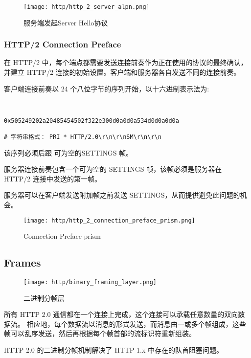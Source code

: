 \begin{figure}[H]
    \centering
    \texttt{[image: http/http\_2\_server\_alpn.png]}
    \caption{服务端发起Server Hello协议}
\end{figure}


\subsubsection{HTTP/2 Connection Preface}


在 HTTP/2 中，每个端点都需要发送连接前奏作为正在使用的协议的最终确认，并建立 HTTP/2 连接的初始设置。客户端和服务器各自发送不同的连接前奏。

客户端连接前奏以 24 个八位字节的序列开始，以十六进制表示法为:

\begin{lstlisting}[style=cshell]


0x505249202a20485454502f322e300d0a0d0a534d0d0a0d0a

# 字符串格式： PRI * HTTP/2.0\r\n\r\nSM\r\n\r\n

\end{lstlisting}

该序列必须后跟 可为空的SETTINGS 帧。


服务器连接前奏包含一个可为空的 SETTINGS 帧，该帧必须是服务器在 HTTP/2 连接中发送的第一帧。

服务器可以在客户端发送附加帧之前发送 SETTINGS，从而提供避免此问题的机会。



\begin{figure}[H]
    \centering
    \texttt{[image: http/http\_2\_connection\_preface\_prism.png]}
    \caption{Connection Preface prism}
\end{figure}


\subsection{Frames}


\begin{figure}[H]
    \centering
    \texttt{[image: http/binary\_framing\_layer.png]}
    \caption{二进制分帧层}
\end{figure}


所有 HTTP 2.0 通信都在一个连接上完成，这个连接可以承载任意数量的双向数据流。
相应地，每个数据流以消息的形式发送，而消息由一或多个帧组成，这些帧可以乱序发送，然后再根据每个帧首部的流标识符重新组装。

HTTP 2.0 的二进制分帧机制解决了 HTTP 1.x 中存在的队首阻塞问题。

